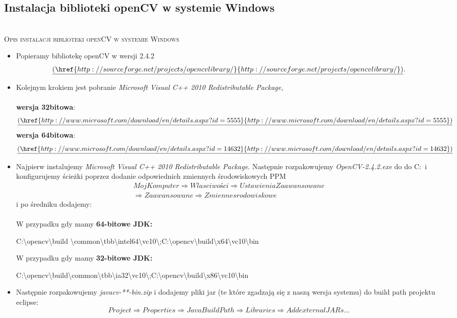 \subsection{Instalacja biblioteki openCV w systemie Windows}
\begin{center}
\HRule \\[0.4cm]
\textsc{\Large Opis instalacji biblioteki openCV w systemie Windows}
\HRule \\[0.4cm]
\end{center}
\begin{itemize}
\item Popieramy bibliotekę openCV w wersji 2.4.2 
\[
\underline{(\href{http://sourceforge.net/projects/opencvlibrary/}{http://sourceforge.net/projects/opencvlibrary/})}.
\]
\item Kolejnym krokiem jest pobranie  \textit{Microsoft Visual C++ 2010 Redistributable Package}, \\ \\
\textbf{wersja 32bitowa}:
\[
\underline{(\href{http://www.microsoft.com/download/en/details.aspx?id=5555}{http://www.microsoft.com/download/en/details.aspx?id=5555})}
\]
\textbf{wersja 64bitowa}:
\[
\underline{(\href{http://www.microsoft.com/download/en/details.aspx?id=14632}{http://www.microsoft.com/download/en/details.aspx?id=14632})}
\]
\item Najpierw instalujemy \textit{Microsoft Visual C++ 2010 Redistributable Package}. Następnie rozpakowujemy \textit{OpenCV-2.4.2.exe} do do C:\ i konfigurujemy ścieżki poprzez dodanie odpowiednich zmiennych środowiskowych PPM
\begin{equation}
\begin{split}
 Moj Komputer \Rightarrow Wlasciwości \Rightarrow Ustawienia Zaawansowane \\ \Rightarrow Zaawansowane  \Rightarrow Zmienne srodowiskowe
\end{split}
\end{equation}  i po średniku dodajemy: \\
\\ W przypadku gdy mamy \textbf{64-bitowe JDK:}
\begin{center}
C:\textbackslash opencv\textbackslash build \textbackslash common\textbackslash tbb\textbackslash intel64\textbackslash vc10\textbackslash ;C:\textbackslash opencv\textbackslash build\textbackslash x64\textbackslash vc10\textbackslash bin\
\end{center}
W przypadku gdy mamy \textbf{32-bitowe JDK:}
\begin{center}
C:\textbackslash opencv\textbackslash build\textbackslash common\textbackslash tbb\textbackslash ia32\textbackslash vc10\textbackslash ;C:\textbackslash opencv\textbackslash build\textbackslash x86\textbackslash vc10\textbackslash bin\
\end{center}
\item Następnie rozpakowujemy \textit{javacv-**-bin.zip} i dodajemy pliki jar (te które zgadzają się z naszą wersja systemu) do build path projektu eclipse:
 \begin{equation}
Project \Rightarrow Properties \Rightarrow  Java Build Path \Rightarrow  Libraries \Rightarrow  Add external JARs...
\end{equation}

\end{itemize}
\pagebreak[4]
